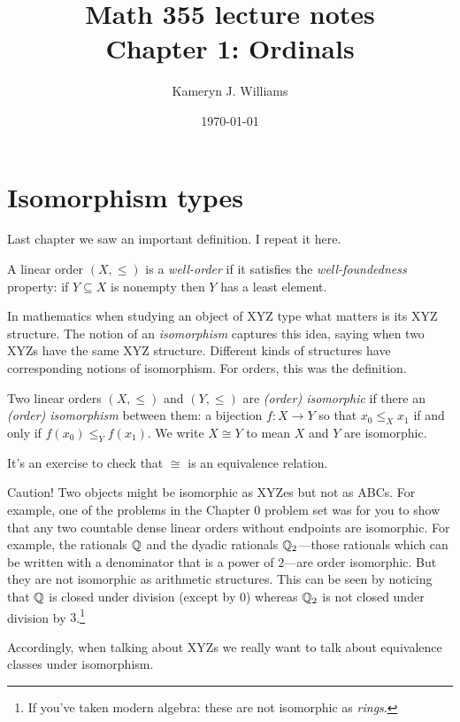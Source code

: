 \documentclass[10pt]{amsart}
\title{Math 355 lecture notes \\ Chapter 1: Ordinals}
\author{Kameryn J. Williams}
\date{\today}
\begin{document}
\maketitle

\section{Isomorphism types}

Last chapter we saw an important definition. I repeat it here.

\begin{definition}
A linear order $(X,\le)$ is a \emph{well-order} if it satisfies the \emph{well-foundedness} property: if $Y \subseteq X$ is nonempty then $Y$ has a least element.
\end{definition}

In mathematics when studying an object of XYZ type what matters is its XYZ structure. The notion of an \emph{isomorphism} captures this idea, saying when two XYZs have the same XYZ structure. Different kinds of structures have corresponding notions of isomorphism. For orders, this was the definition.

\begin{definition}
Two linear orders $(X,\le)$ and $(Y,\le)$ are \emph{(order) isomorphic} if there an \emph{(order) isomorphism} between them: a bijection $f : X \to Y$ so that $x_0 \le_X x_1$ if and only if $f(x_0) \le_Y f(x_1)$. We write $X \cong Y$ to mean $X$ and $Y$ are isomorphic.
\end{definition}

It's an exercise to check that $\cong$ is an equivalence relation.

Caution! Two objects might be isomorphic as XYZes but not as ABCs. For example, one of the problems in the Chapter 0 problem set was for you to show that any two countable dense linear orders without endpoints are isomorphic. For example, the rationals $\mathbb{Q}$ and the dyadic rationals $\mathbb{Q}_2$---those rationals which can be written with a denominator that is a power of $2$---are order isomorphic. But they are not isomorphic as arithmetic structures. This can be seen by noticing that $\mathbb{Q}$ is closed under division (except by $0$) whereas $\mathbb{Q}_2$ is not closed under division by $3$.\footnote{If you've taken modern algebra: these are not isomorphic as \emph{rings}.}

Accordingly, when talking about XYZs we really want to talk about equivalence classes under isomorphism.
\end{document}
